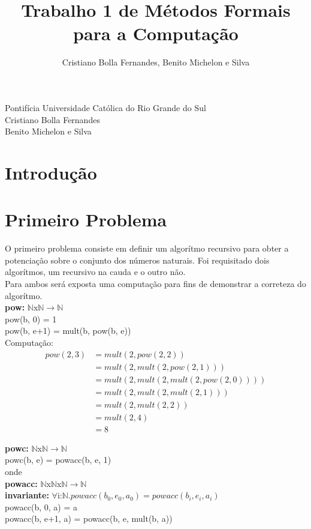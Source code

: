\documentclass{article}
\title{Trabalho 1 de Métodos Formais para a Computação}
\author{Cristiano Bolla Fernandes, Benito Michelon e Silva}
\begin{document}
\maketitle
\begin{center}
Pontifícia Universidade Católica do Rio Grande do Sul\\
Cristiano Bolla Fernandes\\
Benito Michelon e Silva
\end{center}
\section{Introdução}

\section{Primeiro Problema}
O primeiro problema consiste em definir um algorítmo recursivo para obter a potenciação sobre o conjunto dos números naturais.
Foi requisitado dois algorítmos, um recursivo na cauda e o outro não.\\
Para ambos será exposta uma computação para fins de demonstrar a correteza do algorítmo.\\
\textbf{pow:} $\mathbb{N}$x$\mathbb{N}$$\rightarrow \mathbb{N}$\\
pow(b, 0) = 1\\
pow(b, e+1) = mult(b, pow(b, e))\\

Computação:\\
\begin{align*}
pow(2,3) &= mult(2, pow(2, 2))\\
&= mult(2, mult(2, pow(2, 1)))\\
&= mult(2, mult(2, mult(2, pow(2, 0))))\\
&= mult(2, mult(2, mult(2, 1)))\\
&= mult(2, mult(2, 2))\\
&= mult(2, 4)\\
&= 8
\end{align*}

\noindent \textbf{powc:} $\mathbb{N}$x$\mathbb{N}$$\rightarrow \mathbb{N}$\\
powc(b, e) = powacc(b, e, 1)\\
onde\\
\indent \textbf{powacc:} $\mathbb{N}$x$\mathbb{N}$x$\mathbb{N}$$\rightarrow \mathbb{N}$\\
\indent \textbf{invariante:} $\forall$i:$\mathbb{N}. powacc(b_0,e_0, a_0) = powacc(b_i, e_i, a_i)$\\
\indent powacc(b, 0, a) = a\\
\indent powacc(b, e+1, a) = powacc(b, e, mult(b, a))\\
\end{document}
